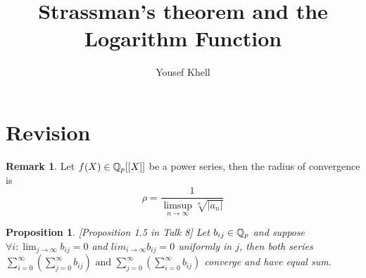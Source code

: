 \documentclass[a4paper]{article}
\title{\vspace{-2cm}Strassman's theorem and the Logarithm Function}
\author{Yousef Khell}
\theoremstyle{plain}
\newtheorem{prop}[thm]{Proposition}
\theoremstyle{definition}
\newtheorem{rem}[thm]{Remark}
\begin{document}
\section{Revision}
\begin{rem}\cite[Prop. 5.4.1]{Gou}
  Let $f(X) \in \Bbb Q_{p}[[X]]$ be a power series, then the radius of convergence is
  $$\rho = \frac{1}{\displaystyle \limsup_{n \to \infty}\sqrt[n]{|a_{n}|}}$$
\end{rem}
\begin{prop}{\cite[Prop. 5.1.4]{Gou}}[Proposition 1.5 in Talk 8]
  Let $b_{ij} \in \Bbb Q_{p}$ and suppose $\forall i: \lim_{j \to \infty}b_{ij} = 0$ and $lim_{i \to \infty}b_{ij} = 0$ uniformly in $j$, then both series
  $\sum_{i=0}^{\infty}\left(\sum_{j=0}^{\infty} b_{ij} \right) \text{ and } \sum_{j=0}^{\infty}\left(\sum_{i=0}^{\infty} b_{ij} \right)$
  converge and have equal sum.
\end{prop}
\end{document}
